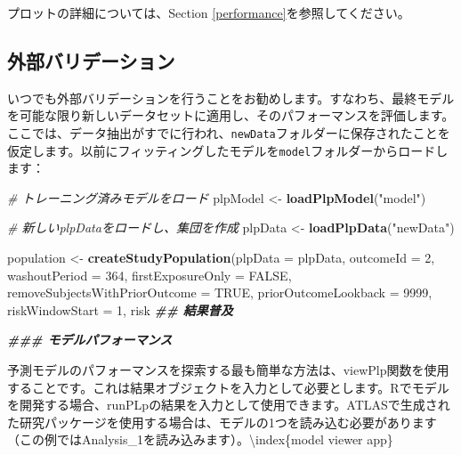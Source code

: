 \documentclass[
  11pt]{book}
\newenvironment{Shaded}{\begin{snugshade}}{\end{snugshade}}
\newcommand{\AttributeTok}[1]{\textcolor[rgb]{0.13,0.29,0.53}{#1}}
\newcommand{\CommentTok}[1]{\textcolor[rgb]{0.56,0.35,0.01}{\textit{#1}}}
\newcommand{\ConstantTok}[1]{\textcolor[rgb]{0.56,0.35,0.01}{#1}}
\newcommand{\DecValTok}[1]{\textcolor[rgb]{0.00,0.00,0.81}{#1}}
\newcommand{\DocumentationTok}[1]{\textcolor[rgb]{0.56,0.35,0.01}{\textbf{\textit{#1}}}}
\newcommand{\FunctionTok}[1]{\textcolor[rgb]{0.13,0.29,0.53}{\textbf{#1}}}
\newcommand{\NormalTok}[1]{#1}
\newcommand{\OtherTok}[1]{\textcolor[rgb]{0.56,0.35,0.01}{#1}}
\newcommand{\StringTok}[1]{\textcolor[rgb]{0.31,0.60,0.02}{#1}}
\theoremstyle{definition}
\theoremstyle{definition}
\theoremstyle{definition}
\theoremstyle{definition}
\theoremstyle{remark}
\begin{document}
プロットの詳細については、Section \ref{performance}を参照してください。

\subsection{外部バリデーション}\label{ux5916ux90e8ux30d0ux30eaux30c7ux30fcux30b7ux30e7ux30f3}

いつでも外部バリデーションを行うことをお勧めします。すなわち、最終モデルを可能な限り新しいデータセットに適用し、そのパフォーマンスを評価します。ここでは、データ抽出がすでに行われ、\texttt{newData}フォルダーに保存されたことを仮定します。以前にフィッティングしたモデルを\texttt{model}フォルダーからロードします：

\begin{Shaded}
\begin{Highlighting}[]
\CommentTok{\# トレーニング済みモデルをロード}
\NormalTok{plpModel }\OtherTok{\textless{}{-}} \FunctionTok{loadPlpModel}\NormalTok{(}\StringTok{"model"}\NormalTok{)}

\CommentTok{\# 新しいplpDataをロードし、集団を作成}
\NormalTok{plpData }\OtherTok{\textless{}{-}} \FunctionTok{loadPlpData}\NormalTok{(}\StringTok{"newData"}\NormalTok{)}

\NormalTok{population }\OtherTok{\textless{}{-}} \FunctionTok{createStudyPopulation}\NormalTok{(}\AttributeTok{plpData =}\NormalTok{ plpData,}
                                    \AttributeTok{outcomeId =} \DecValTok{2}\NormalTok{,}
                                    \AttributeTok{washoutPeriod =} \DecValTok{364}\NormalTok{,}
                                    \AttributeTok{firstExposureOnly =} \ConstantTok{FALSE}\NormalTok{,}
                                    \AttributeTok{removeSubjectsWithPriorOutcome =} \ConstantTok{TRUE}\NormalTok{,}
                                    \AttributeTok{priorOutcomeLookback =} \DecValTok{9999}\NormalTok{,}
                                    \AttributeTok{riskWindowStart =} \DecValTok{1}\NormalTok{,}
\NormalTok{                                    risk}
\DocumentationTok{\#\# 結果普及}

\DocumentationTok{\#\#\# モデルパフォーマンス}

\NormalTok{予測モデルのパフォーマンスを探索する最も簡単な方法は、}\StringTok{\textasciigrave{}}\AttributeTok{viewPlp}\StringTok{\textasciigrave{}}\NormalTok{関数を使用することです。これは結果オブジェクトを入力として必要とします。Rでモデルを開発する場合、}\StringTok{\textasciigrave{}}\AttributeTok{runPLp}\StringTok{\textasciigrave{}}\NormalTok{の結果を入力として使用できます。ATLASで生成された研究パッケージを使用する場合は、モデルの1つを読み込む必要があります（この例ではAnalysis\_1を読み込みます）。\textbackslash{}index\{model viewer app\}}
\end{Highlighting}
\end{Shaded}
\end{document}
